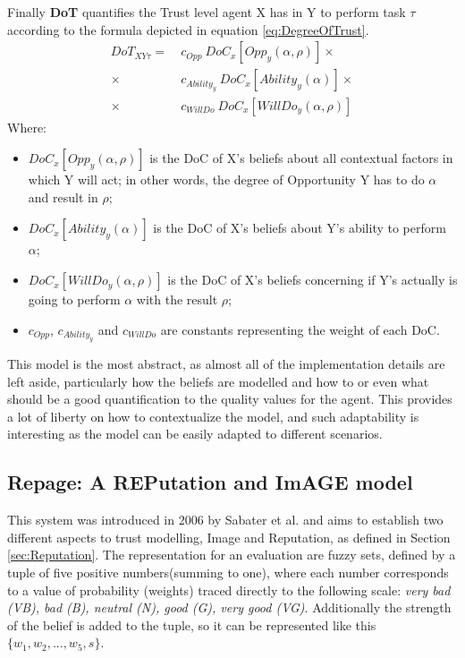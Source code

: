 Finally \textbf{\ac{DoT}} quantifies the Trust level agent X has in Y to perform task $\tau$ according to the formula depicted in equation \ref{eq:DegreeOfTrust}.
\begin{equation}
\begin{aligned}
DoT_{XY\tau} =\ &c_{Opp}\ DoC_x[Opp_y(\alpha, \rho)] \times\\
\times\ &c_{Ability_y}\ DoC_x[Ability_y(\alpha)]\times \\
\times\ &c_{WillDo}\ DoC_x[WillDo_y(\alpha, \rho)]
\end{aligned}
\label{eq:DegreeOfTrust}
\end{equation}
Where:
\begin{itemize}
    \item $DoC_x[Opp_y(\alpha, \rho)]$ is the \ac{DoC} of X's beliefs about all contextual factors in which Y will act; in other words, the degree of Opportunity Y has to do $\alpha$ and result in $\rho$;
    \item $DoC_x[Ability_y(\alpha)]$ is the \ac{DoC} of X's beliefs about Y's ability to perform $\alpha$;
    \item $DoC_x[WillDo_y(\alpha, \rho)]$ is the \ac{DoC} of X's beliefs concerning if Y's actually is going to perform $\alpha$ with the result $\rho$;
    \item $c_{Opp}$, $c_{Ability_y}$ and $c_{WillDo}$ are constants representing the weight of each \ac{DoC}.
\end{itemize}

This model is the most abstract, as almost all of the implementation details are left aside, particularly how the beliefs are modelled and how to or even what should be a good quantification to the quality values for the agent. This provides a lot of liberty on how to contextualize the model, and such adaptability is interesting as the model can be easily adapted to different scenarios.

\subsection{Repage: A REPutation and ImAGE model}
\label{subsec:Related work:Trust Models:Repage}
This system was introduced in 2006 by Sabater et al. \cite{Sabater2006} and aims to establish two different aspects to trust modelling, Image and Reputation, as defined in Section \ref{sec:Reputation}. The representation for an evaluation are fuzzy sets, defined by a tuple of five positive numbers(summing to one), where each number corresponds to a value of probability (weights) traced directly to the following scale: \textit{very bad (VB), bad (B), neutral (N), good (G), very good (VG)}. Additionally the strength of the belief is added to the tuple, so it can be represented like this $\{w_1, w_2, ..., w_5, s\}$.

